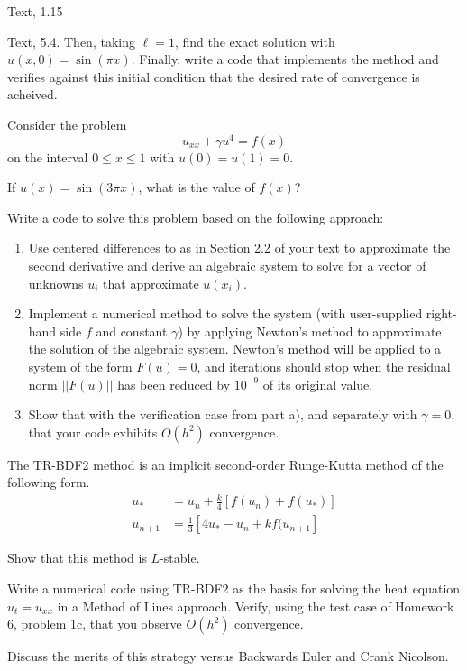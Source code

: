 \documentclass[minion]{homework}
\begin{document}
\begin{problems}

\problem Text, 1.15

\problem Text, 5.4.  Then, taking $\ell=1$, find the exact solution with
$u(x,0)=\sin(\pi x)$. Finally, write a code that implements the method
and verifies against this initial condition that the desired rate
of convergence is acheived.

\problem Consider the problem
\[
u_{xx} + \gamma u^4 = f(x)
\]
on the interval $0\le x\le 1$ with $u(0)=u(1)=0$.
\begin{subproblems}
\item If $u(x)=\sin(3\pi x)$, what is the value of $f(x)$?
\item Write a code to solve this problem based on the
following approach:
\begin{enumerate}
	\item Use centered differences to as in Section 2.2 of
	your text to approximate the second derivative and
	derive an algebraic system to solve for a vector of unknowns
	$u_i$ that approximate $u(x_i)$. 
	\item Implement a numerical method to solve the system
	(with user-supplied right-hand side $f$ and constant $\gamma$)
	by applying Newton's method to approximate the solution
	of the algebraic system.  Newton's method will be applied
	to a system of the form $F(u)=0$, and iterations should
	stop when the residual norm $||F(u)||$ has been reduced by $10^{-9}$
	of its original value.
	\item Show that with the verification case from part a), and separately with
	$\gamma=0$, that your code exhibits $O(h^2)$ convergence.
\end{enumerate}
\end{subproblems}

\problem The TR-BDF2 method is an implicit second-order
Runge-Kutta method of the following form.
\begin{equation}
\begin{aligned}
u_* &= u_n + \frac{k}{4}\left[ f(u_n) + f(u_*)\right] \\
u_{n+1} &=  \frac{1}{3}\left[4u_*-u_n + kf(u_{n+1}\right]
\end{aligned}
\end{equation}
\begin{subproblems}
\item Show that this method is $L$-stable.
\item Write a numerical code using TR-BDF2 as the basis 
for solving the heat equation $u_t=u_{xx}$ in 
a Method of Lines approach.  Verify, using the test case of
Homework 6, problem 1c, that you observe $O(h^2)$ convergence.
\item Discuss the merits of this strategy versus Backwards Euler
and Crank Nicolson.
\end{subproblems}
\end{problems}
\end{document}
